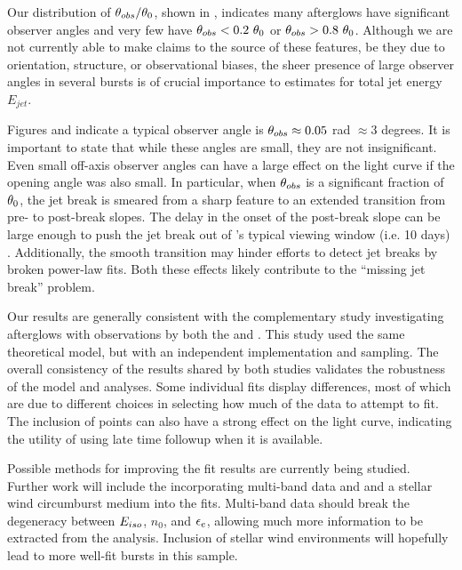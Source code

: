 Our distribution of $\theta_{obs}/\theta_0$, shown in , indicates many afterglows have significant observer angles and very few have $\thobs < 0.2\ \thO$ or $\thobs > 0.8\ \thO$.  Although we are not currently able to make claims to the source of these features, be they due to orientation, structure, or observational biases, the sheer presence of large observer angles in several bursts is of crucial importance to estimates for total jet energy $E_{jet}$.  

Figures  and  indicate a typical observer angle is $\theta_{obs} \approx 0.05$ rad $\approx 3$ degrees.  It is important to state that while these angles are small, they are not insignificant.  Even small off-axis observer angles can have a large effect on the light curve if the opening angle was also small.  In particular, when $\theta_{obs}$ is a significant fraction of $\theta_0$, the jet break is smeared from a sharp feature to an extended transition from pre- to post-break slopes.  The delay in the onset of the post-break slope can be large enough to push the jet break out of \swift{}'s typical viewing window (i.e. 10 days) \citep{vanEer10offaxis, vanEer11}.  Additionally, the smooth transition may hinder efforts to detect jet breaks by broken power-law fits.  Both these effects likely contribute to the  ``missing jet break'' problem.
  
Our results are generally consistent with the complementary study investigating afterglows with observations by both the \swiftXRT{} and \chandra{} \citep{Zhang14}.  This study used the same theoretical model, but with an independent implementation and \multinest{} sampling.  The overall consistency of the results shared by both studies validates the robustness of the model and analyses.  Some individual fits display differences, most of which are due to different choices in selecting how much of the \swiftXRT{} data to attempt to fit.  The inclusion of \chandra{} points can also have a strong effect on the light curve, indicating the utility of using late time followup when it is available.

Possible methods for improving the fit results are currently being studied.  Further work will include the incorporating multi-band data and and a stellar wind circumburst medium into the fits.  Multi-band data should break the degeneracy between $E_{iso}$, $n_0$, and $\epsilon_e$, allowing much more information to be extracted from the analysis.  Inclusion of stellar wind environments will hopefully lead to more well-fit bursts in this sample.

